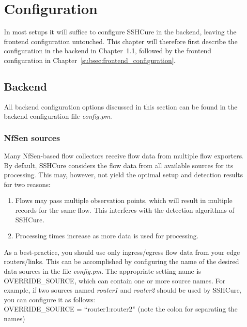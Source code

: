\section{Configuration} \label{sec:configuration}

In most setups it will suffice to configure SSHCure in the backend, leaving the frontend configuration untouched. This chapter will therefore first describe the configuration in the backend in Chapter~\ref{subsec:backend_configuration}, followed by the frontend configuration in Chapter~\ref{subsec:frontend_configuration}.

\subsection{Backend} \label{subsec:backend_configuration}

All backend configuration options discussed in this section can be found in the backend configuration file \textit{config.pm}.

\subsubsection{NfSen sources}

Many NfSen-based flow collectors receive flow data from multiple flow exporters. By default, SSHCure considers the flow data from all available sources for its processing. This may, however, not yield the optimal setup and detection results for two reasons:

\begin{enumerate}
	\item Flows may pass multiple observation points, which will result in multiple records for the same flow. This interferes with the detection algorithms of SSHCure.
	\item Processing times increase as more data is used for processing.
\end{enumerate}

As a best-practice, you should use only ingress/egress flow data from your edge routers/links. This can be accomplished by configuring the name of the desired data sources in the file \textit{config.pm}. The appropriate setting name is OVERRIDE\_SOURCE, which can contain one or more source names. For example, if two sources named \textit{router1} and \textit{router2} should be used by SSHCure, you can configure it as follows: \\

OVERRIDE\_SOURCE = ``router1:router2'' \hfill (note the colon for separating the names) \\


